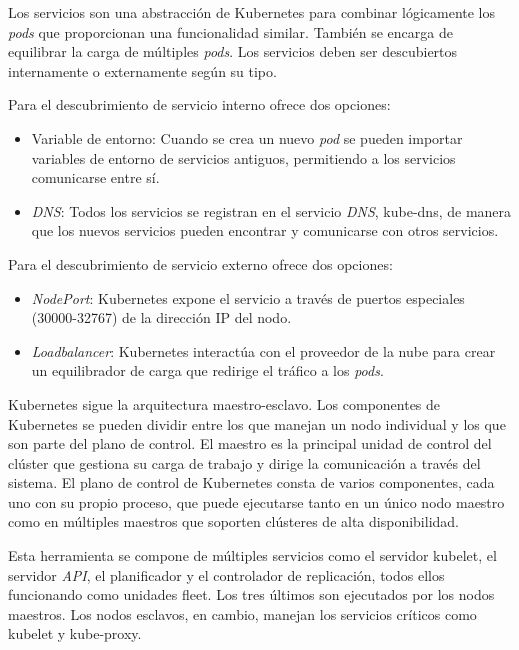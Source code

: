 Los servicios son una abstracción de Kubernetes para combinar lógicamente los \textit{pods} que proporcionan una funcionalidad similar. También se encarga de equilibrar la carga de múltiples \textit{pods}. Los servicios deben ser descubiertos internamente o externamente según su tipo.

Para el descubrimiento de servicio interno ofrece dos opciones:
\begin{itemize}
\item Variable de entorno: Cuando se crea un nuevo \textit{pod} se pueden importar variables de entorno de servicios antiguos, permitiendo a los servicios comunicarse entre sí.
\item \textit{DNS}: Todos los servicios se registran en el servicio \textit{DNS}, kube-dns, de manera que los nuevos servicios pueden encontrar y comunicarse con otros servicios.
\end{itemize}

Para el descubrimiento de servicio externo ofrece dos opciones:
\begin{itemize}
\item \textit{NodePort}: Kubernetes expone el servicio a través de puertos especiales (30000-32767) de la dirección IP del nodo.
\item \textit{Loadbalancer}: Kubernetes interactúa con el proveedor de la nube para crear un equilibrador de carga que redirige el tráfico a los \textit{pods}.
\end{itemize}

Kubernetes sigue la arquitectura maestro-esclavo. Los componentes de Kubernetes se pueden dividir entre los que manejan un nodo individual y los que son parte del plano de control. El maestro es la principal unidad de control del clúster que gestiona su carga de trabajo y dirige la comunicación a través del sistema. El plano de control de Kubernetes consta de varios componentes, cada uno con su propio proceso, que puede ejecutarse tanto en un único nodo maestro como en múltiples maestros que soporten clústeres de alta disponibilidad.

Esta herramienta se compone de múltiples servicios como el servidor kubelet, el servidor \textit{API}, el planificador y el controlador de replicación, todos ellos funcionando como unidades fleet. Los tres últimos son ejecutados por los nodos maestros. Los nodos esclavos, en cambio, manejan los servicios críticos como kubelet y kube-proxy.

